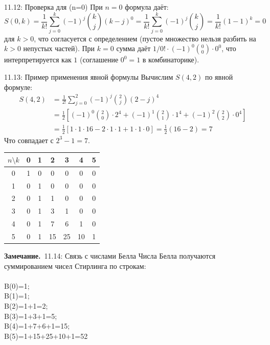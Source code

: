\documentclass[a4paper,12pt]{article}
\newcommand{\myremark}{\textbf{Замечание.}\ }
\begin{document}
	\begin{corollarybox}{11.12: Проверка для (n=0)}
		При \(n = 0\) формула даёт:
		\[ S(0, k) = \frac{1}{k!} \sum_{j=0}^{k} (-1)^j \binom{k}{j} (k-j)^0 = \frac{1}{k!} \sum_{j=0}^{k} (-1)^j \binom{k}{j} = \frac{1}{k!} (1 - 1)^k = 0 \]
		для \(k > 0\), что согласуется с определением (пустое множество нельзя разбить на \(k>0\) непустых частей). При \(k=0\) сумма даёт \(1/0! \cdot (-1)^0 \binom{0}{0} \cdot 0^0\), что интерпретируется как \(1\) (соглашение \(0^0 = 1\) в комбинаторике).
	\end{corollarybox}
	
	\begin{examplebox}{11.13: Пример применения явной формулы}
		Вычислим \(S(4,2)\) по явной формуле:
		\begin{align*}
			S(4,2) &= \frac{1}{2!} \sum_{j=0}^{2} (-1)^j \binom{2}{j} (2-j)^4 \\
			&= \frac{1}{2} \left[ (-1)^0 \binom{2}{0} \cdot 2^4 + (-1)^1 \binom{2}{1} \cdot 1^4 + (-1)^2 \binom{2}{2} \cdot 0^4 \right] \\
			&= \frac{1}{2} \left[ 1 \cdot 1 \cdot 16 - 2 \cdot 1 \cdot 1 + 1 \cdot 1 \cdot 0 \right] = \frac{1}{2} (16 - 2) = 7
		\end{align*}
		Что совпадает с \(2^{3} - 1 = 7\).
	\end{examplebox}
	
	\begin{center}
		\begin{tabular}{|c|cccccc|}
			\hline
			\(n \setminus k\) & 0 & 1 & 2 & 3 & 4 & 5 \\ \hline
			0 & 1 & 0 & 0 & 0 & 0 & 0 \\
			1 & 0 & 1 & 0 & 0 & 0 & 0 \\
			2 & 0 & 1 & 1 & 0 & 0 & 0 \\
			3 & 0 & 1 & 3 & 1 & 0 & 0 \\
			4 & 0 & 1 & 7 & 6 & 1 & 0 \\
			5 & 0 & 1 & 15 & 25 & 10 & 1 \\ \hline
		\end{tabular}
	\end{center}
	
	\myremark{11.14: Связь с числами Белла}
		Числа Белла получаются суммированием чисел Стирлинга по строкам:\\ \\
		B(0)=1;\\
		B(1)=1; \\
		B(2)=1+1=2;\\ 
		B(3)=1+3+1=5;\\
		B(4)=1+7+6+1=15;\\
		B(5)=1+15+25+10+1=52
	
\end{document}
